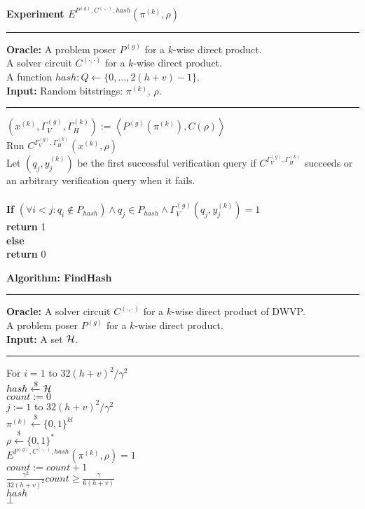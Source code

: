 %
%
\begin{codeblock}
  \textbf{Experiment $E^{P^{(g)}, C^{(\cdot, \cdot)}, hash}(\pi^{(k)}, \rho)$}
  \medskip

  \hrule

  \medskip
  \textbf{Oracle:} A problem poser $P^{(g)}$ for a $k$-wise direct product. \\
  \IndI A solver circuit $C^{(\cdot, \cdot)}$ for a $k$-wise direct product. \\
  \IndI A function $hash: Q \leftarrow \{0, \dots, 2(h+v) - 1\}$.\\
  \textbf{Input:} Random bitstrings: $\pi^{(k)}$, $\rho$.
  \medskip\hrule\medskip
  $(x^{(k)}, \Gamma_V^{(g)}, \Gamma_H^{(k)}) := \left\langle P^{(g)}(\pi^{(k)}), C(\rho) \right\rangle$\\
  Run $C^{\Gamma_V^{(g)}, \Gamma_H^{(k)}} (x^{(k)}, \rho)$ \\
  \IndI Let $(q_j,y_j^{(k)})$ be the first successful verification query if $C^{\Gamma_V^{(g)}, \Gamma_H^{(k)}}$ succeeds or \\
  \IndI an arbitrary verification query when it fails.\\
  \\
  \textbf{If} $(\forall i < j :  q_i \notin P_{hash} ) \land q_j \in P_{hash} \land \Gamma_V^{(g)}(q_j, y_j^{(k)}) = 1$ \\
  \IndI \textbf{return} 1\\
  \textbf{else}\\
  \IndI \textbf{return} 0
\end{codeblock}
%
\begin{codeblock}
  \textbf{Algorithm: FindHash}
  \medskip
  \hrule
  \medskip

  \textbf{Oracle:} A solver circuit $C^{(\cdot, \cdot)}$ for a $k$-wise direct product of DWVP. \\
  \IndII A problem poser $P^{(g)}$ for a $k$-wise direct product. \\
  \textbf{Input:} A set $\mathcal{H}$.
  \medskip\hrule\medskip
  For $i = 1$ to $32(h+v)^2/\gamma^2$ \\
  \IndI $hash \xleftarrow{\$} \mathcal{H}$ \\
  \IndI $count := 0$ \\
  \IndI \For $j := 1$ to $32(h+v)^2/\gamma^2$ \\
  \IndII $\pi^{(k)} \xleftarrow{\$} \{0,1\}^{kl} $\\
  \IndII $\rho \xleftarrow{\$} \{0,1\}^{*} $\\
  \IndII \If $E^{P^{(g)}, C^{(\cdot, \cdot)}, hash}(\pi^{(k)}, \rho) = 1$ \then \\
  \IndIII $count := count + 1$\\
  \IndI \If $\frac{\gamma^2}{32(h+v)^2} count \geq \frac{\gamma}{6(h+v)}$ \\
  \IndII \return $hash$\\
  \return $\bot$
\end{codeblock}
